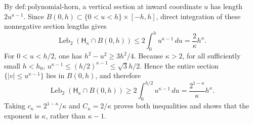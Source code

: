 By \(\mathrm{def:polynomial\text{-}horn}\), a vertical section at inward coordinate \(u\) has length \(2u^{\kappa-1}\). Since \(B(0,h)\subset\{0<u<h\}\times[-h,h]\), direct integration of these nonnegative section lengths gives
\[
 \operatorname{Leb}_2(\mathsf H_{\kappa}\cap B(0,h))
 \le 2\int_0^h u^{\kappa-1}\,du=\frac{2}{\kappa}h^{\kappa}.
\]
For \(0<u<h/2\), one has \(h^2-u^2\ge3h^2/4\). Because \(\kappa>2\), for all sufficiently small \(h<h_0\), \(u^{\kappa-1}\le(h/2)^{\kappa-1}\le\sqrt3h/2\). Hence the entire section \(\{|v|\le u^{\kappa-1}\}\) lies in \(B(0,h)\), and therefore
\[
 \operatorname{Leb}_2(\mathsf H_{\kappa}\cap B(0,h))
 \ge2\int_0^{h/2}u^{\kappa-1}\,du
 =\frac{2^{1-\kappa}}{\kappa}h^{\kappa}.
\]
Taking \(c_\kappa=2^{1-\kappa}/\kappa\) and \(C_\kappa=2/\kappa\) proves both inequalities and shows that the exponent is \(\kappa\), rather than \(\kappa-1\).